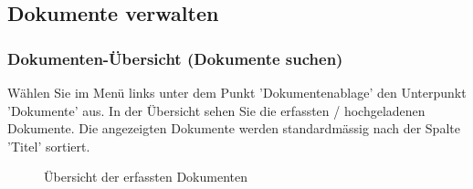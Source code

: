 \pagebreak
\subsection{Dokumente verwalten}
\label{bkm:Ref442273482}

\subsubsection{Dokumenten-Übersicht (Dokumente suchen)}
\label{bkm:Ref443047823}

Wählen Sie im Menü links unter dem Punkt 'Dokumentenablage' den Unterpunkt 'Dokumente' aus. In der Übersicht sehen Sie die erfassten / hochgeladenen Dokumente. Die angezeigten Dokumente werden standardmässig nach der Spalte 'Titel' sortiert. 

\begin{figure}[H]
\caption{Übersicht der erfassten Dokumenten}
\end{figure}

